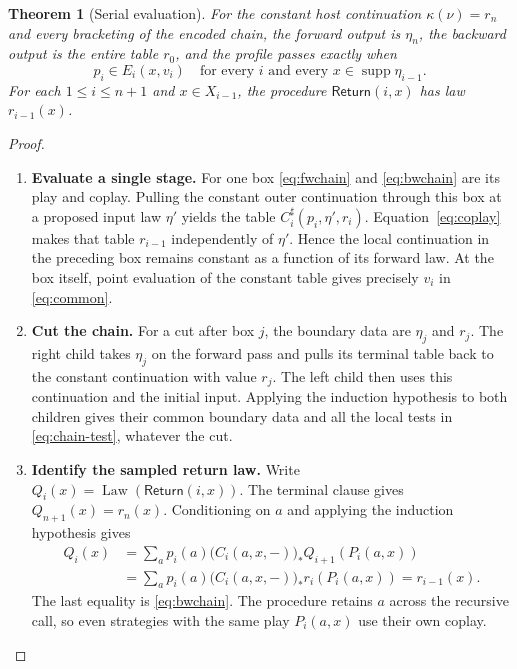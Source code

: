 \documentclass[11pt,a4paper]{article}
\newtheorem{theorem}{Theorem}[section]
\theoremstyle{definition}
\newcommand{\supp}{\operatorname{supp}}
\begin{document}
\begin{theorem}[Serial evaluation]\label{thm:chain}
    For the constant host continuation $\kappa(\nu)=r_n$ and every bracketing of the encoded chain, the forward output is $\eta_n$, the backward output is the entire table $r_0$, and the profile passes exactly when
    \begin{equation}
        p_i\in E_i(x,v_i)\quad\text{for every }i
        \text{ and every }x\in\supp\eta_{i-1}.
        \label{eq:chain-test}
    \end{equation}
    For each $1\le i\le n+1$ and $x\in X_{i-1}$, the procedure $\mathsf{Return}(i,x)$ has law $r_{i-1}(x)$.
\end{theorem}
\begin{proof}\leavevmode
    \begin{enumerate}[titledsteps]
        \item \textbf{Evaluate a single stage.} For one box \eqref{eq:fwchain} and \eqref{eq:bwchain} are its play and coplay. Pulling the constant outer continuation through this box at a proposed input law $\eta'$ yields the table $C_i^\sharp(p_i,\eta',r_i)$. Equation~\eqref{eq:coplay} makes that table $r_{i-1}$ independently of $\eta'$. Hence the local continuation in the preceding box remains constant as a function of its forward law. At the box itself, point evaluation of the constant table gives precisely $v_i$ in \eqref{eq:common}.

        \item \textbf{Cut the chain.} For a cut after box $j$, the boundary data are $\eta_j$ and $r_j$. The right child takes $\eta_j$ on the forward pass and pulls its terminal table back to the constant continuation with value $r_j$. The left child then uses this continuation and the initial input. Applying the induction hypothesis to both children gives their common boundary data and all the local tests in \eqref{eq:chain-test}, whatever the cut.

        \item \textbf{Identify the sampled return law.} Write $Q_i(x)=\operatorname{Law}(\mathsf{Return}(i,x))$. The terminal clause gives $Q_{n+1}(x)=r_n(x)$. Conditioning on $a$ and applying the induction hypothesis gives
        \[
            \begin{aligned}
                Q_i(x)&=\sum_a p_i(a)\big(C_i(a,x,-)\big)_*Q_{i+1}(P_i(a,x))\\
                &=\sum_a p_i(a)\big(C_i(a,x,-)\big)_*r_i(P_i(a,x))
                =r_{i-1}(x).
            \end{aligned}
        \]
        The last equality is \eqref{eq:bwchain}. The procedure retains $a$ across the recursive call, so even strategies with the same play $P_i(a,x)$ use their own coplay.\qedhere
    \end{enumerate}
\end{proof}
\end{document}
